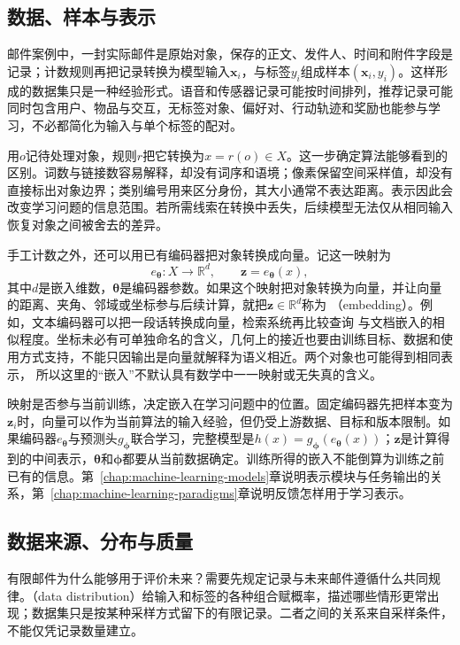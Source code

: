 \subsection{数据、样本与表示}
\label{sec:experience-data-representation}

邮件案例中，一封实际邮件是原始对象，保存的正文、发件人、时间和附件字段是记录；计数规则再把记录转换为模型输入$\bm{x}_i$，与标签$y_i$组成样本$(\bm{x}_i,y_i)$。这样形成的数据集只是一种经验形式。语音和传感器记录可能按时间排列，推荐记录可能同时包含用户、物品与交互，无标签对象、偏好对、行动轨迹和奖励也能参与学习，不必都简化为输入与单个标签的配对。

用$o$记待处理对象，规则$r$把它转换为$x=r(o)\in X$。这一步确定算法能够看到的区别。词数与链接数容易解释，却没有词序和语境；像素保留空间采样值，却没有直接标出对象边界；类别编号用来区分身份，其大小通常不表达距离。表示因此会改变学习问题的信息范围。若所需线索在转换中丢失，后续模型无法仅从相同输入恢复对象之间被舍去的差异。

手工计数之外，还可以用已有编码器把对象转换成向量。记这一映射为
\[
  e_{\bm{\theta}}:X\to\mathbb{R}^d,\qquad
  \bm{z}=e_{\bm{\theta}}(x),
\]
其中$d$是嵌入维数，$\bm{\theta}$是编码器参数。如果这个映射把对象转换为向量，并让向量
的距离、夹角、邻域或坐标参与后续计算，就把$\bm{z}\in\mathbb{R}^d$称为
（embedding）。例如，文本编码器可以把一段话转换成向量，检索系统再比较查询
与文档嵌入的相似程度。坐标未必有可单独命名的含义，几何上的接近也要由训练目标、数据和使用方式支持，不能只因输出是向量就解释为语义相近。两个对象也可能得到相同表示，
所以这里的“嵌入”不默认具有数学中一一映射或无失真的含义。

映射是否参与当前训练，决定嵌入在学习问题中的位置。固定编码器先把样本变为$\bm z_i$时，向量可以作为当前算法的输入经验，但仍受上游数据、目标和版本限制。如果编码器$e_{\bm{\theta}}$与预测头$g_{\bm{\phi}}$联合学习，完整模型是$h(x)=g_{\bm{\phi}}(e_{\bm{\theta}}(x))$；$\bm z$是计算得到的中间表示，$\bm{\theta}$和$\bm{\phi}$都要从当前数据确定。训练所得的嵌入不能倒算为训练之前已有的信息。第~\ref{chap:machine-learning-models}章说明表示模块与任务输出的关系，第~\ref{chap:machine-learning-paradigms}章说明反馈怎样用于学习表示。

\subsection{数据来源、分布与质量}
\label{sec:experience-data-distribution}

有限邮件为什么能够用于评价未来？需要先规定记录与未来邮件遵循什么共同规律。（data distribution）给输入和标签的各种组合赋概率，描述哪些情形更常出现；数据集只是按某种采样方式留下的有限记录。二者之间的关系来自采样条件，不能仅凭记录数量建立。

